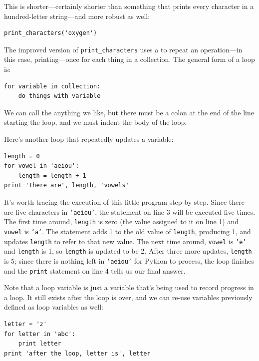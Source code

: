 \documentclass{book}
\begin{document}
This is shorter---certainly shorter than something that prints every
character in a hundred-letter string---and more robust as well:

\begin{verbatim}
print_characters('oxygen')
\end{verbatim}

The improved version of \texttt{print\_characters} uses a
 to repeat an operation---in this case,
printing---once for each thing in a collection. The general form of a
loop is:

\begin{verbatim}
for variable in collection:
    do things with variable
\end{verbatim}

We can call the  anything we
like, but there must be a colon at the end of the line starting the
loop, and we must indent the body of the loop.

Here's another loop that repeatedly updates a variable:

\begin{verbatim}
length = 0
for vowel in 'aeiou':
    length = length + 1
print 'There are', length, 'vowels'
\end{verbatim}

It's worth tracing the execution of this little program step by step.
Since there are five characters in \texttt{'aeiou'}, the statement on
line 3 will be executed five times. The first time around,
\texttt{length} is zero (the value assigned to it on line 1) and
\texttt{vowel} is \texttt{'a'}. The statement adds 1 to the old value of
\texttt{length}, producing 1, and updates \texttt{length} to refer to
that new value. The next time around, \texttt{vowel} is \texttt{'e'} and
\texttt{length} is 1, so \texttt{length} is updated to be 2. After three
more updates, \texttt{length} is 5; since there is nothing left in
\texttt{'aeiou'} for Python to process, the loop finishes and the
\texttt{print} statement on line 4 tells us our final answer.

Note that a loop variable is just a variable that's being used to record
progress in a loop. It still exists after the loop is over, and we can
re-use variables previously defined as loop variables as well:

\begin{verbatim}
letter = 'z'
for letter in 'abc':
    print letter
print 'after the loop, letter is', letter
\end{verbatim}
\end{document}
